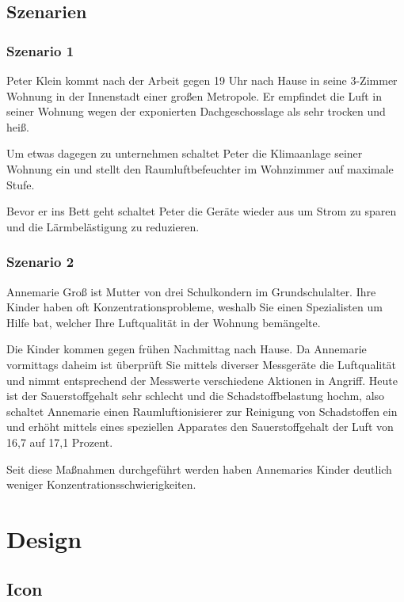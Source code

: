 \documentclass[a4paper,10pt]{article}
\begin{document}
\newpage



\subsection{Szenarien}

\subsubsection{Szenario 1}
Peter Klein kommt nach der Arbeit gegen 19 Uhr nach Hause in seine 3-Zimmer Wohnung in der Innenstadt einer großen Metropole. Er empfindet die Luft in seiner Wohnung wegen der exponierten Dachgeschosslage als sehr trocken und heiß.

Um etwas dagegen zu unternehmen schaltet Peter die Klimaanlage seiner Wohnung ein und stellt den Raumluftbefeuchter im Wohnzimmer auf maximale Stufe.

Bevor er ins Bett geht schaltet Peter die Geräte wieder aus um Strom zu sparen und die Lärmbelästigung zu reduzieren.

\subsubsection{Szenario 2}
Annemarie Groß ist Mutter von drei Schulkondern im Grundschulalter. Ihre Kinder haben oft Konzentrationsprobleme, weshalb Sie einen Spezialisten um Hilfe bat, welcher Ihre Luftqualität in der Wohnung bemängelte.

Die Kinder kommen gegen frühen Nachmittag nach Hause. Da Annemarie vormittags daheim ist überprüft Sie mittels diverser Messgeräte die Luftqualität und nimmt entsprechend der Messwerte verschiedene Aktionen in Angriff. Heute ist der Sauerstoffgehalt sehr schlecht und die Schadstoffbelastung hochm, also schaltet Annemarie einen Raumluftionisierer zur Reinigung von Schadstoffen ein und erhöht mittels eines speziellen Apparates den Sauerstoffgehalt der Luft von 16,7 auf 17,1 Prozent.

Seit diese Maßnahmen durchgeführt werden haben Annemaries Kinder deutlich weniger Konzentrationsschwierigkeiten.

\newpage



\section{Design}

\subsection{Icon}
\end{document}
